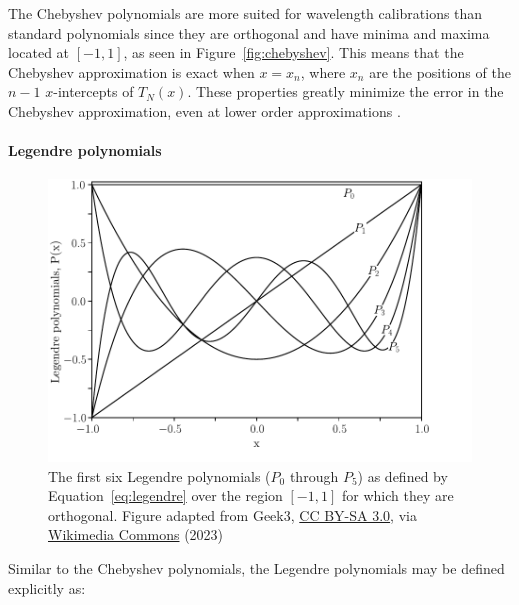 

The Chebyshev polynomials are more suited for wavelength calibrations than standard polynomials since they are orthogonal and have minima and maxima located at $[-1, 1]$, as seen in Figure~\ref{fig:chebyshev}. This means that the Chebyshev approximation is exact when $x = x_{n}$, where $x_{n}$ are the positions of the $n - 1$ $x$-intercepts of $T_{N}(x)$. These properties greatly minimize the error in the Chebyshev approximation, even at lower order approximations \citep{cheby}.


\paragraph{Legendre polynomials}

\begin{figure}[t]
  \centering
  \includegraphics[width = 12cm]{figures/2_legendre.pdf}
  \caption{The first six Legendre polynomials ($P_0$ through $P_{5}$) as defined by Equation~\ref{eq:legendre} over the region $[-1, 1]$ for which they are orthogonal. Figure adapted from Geek3, \protect\href{https://creativecommons.org/licenses/by-sa/3.0}{CC BY-SA 3.0}, via \protect\href{https://commons.wikimedia.org/wiki/File:Legendrepolynomials6.svg}{Wikimedia Commons} (2023)}
  \label{fig:legendre}
\end{figure}

Similar to the Chebyshev polynomials, the Legendre polynomials may be defined explicitly as:

